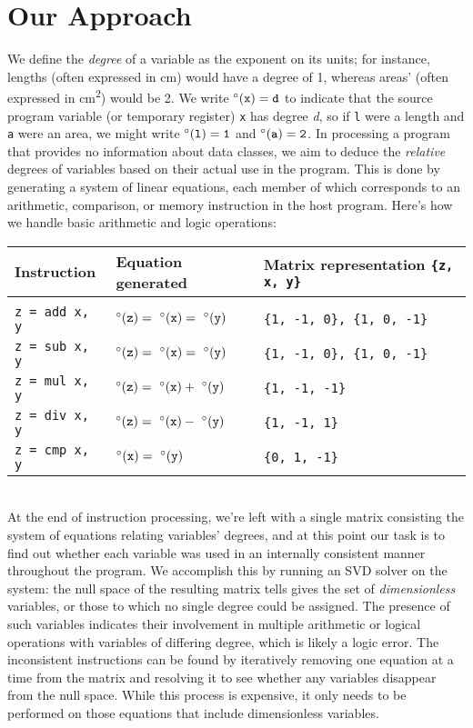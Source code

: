 \documentclass[12pt]{article}
\begin{document}
\section{Our Approach}

We define the \textit{degree} of a variable as the exponent on its units; for instance, lengths (often expressed in cm) would have a degree of 1, whereas areas' (often expressed in cm\textsuperscript{2}) would be 2.
We write $\degree(\tt{x}) = d$ to indicate that the source program variable (or temporary register) \texttt{x} has degree \textit{d}, so if \texttt{l} were a length and \texttt{a} were an area, we might write $\degree(\tt{l}) = 1$ and $\degree(\tt{a}) = 2$.
In processing a program that provides no information about data classes, we aim to deduce the \textit{relative} degrees of variables based on their actual use in the program.
This is done by generating a system of linear equations, each member of which corresponds to an arithmetic, comparison, or memory instruction in the host program.
Here's how we handle basic arithmetic and logic operations:
\\

\begin{tabular}{l l l}
\textbf{Instruction} & \textbf{Equation generated} & \textbf{Matrix representation \texttt{\{z, x, y\}}} \\
\hline \\
\texttt{z = add x, y} & $\degree(\tt{z}) =\ \degree(\tt{x}) =\ \degree(\tt{y})$ & \texttt{\{1, -1, 0\}, \{1, 0, -1\}}\\
\texttt{z = sub x, y} & $\degree(\tt{z}) =\ \degree(\tt{x}) =\ \degree(\tt{y})$ & \texttt{\{1, -1, 0\}, \{1, 0, -1\}}\\
\texttt{z = mul x, y} & $\degree(\tt{z}) =\ \degree(\tt{x}) +\ \degree(\tt{y})$ & \texttt{\{1, -1, -1\}} \\
\texttt{z = div x, y} & $\degree(\tt{z}) =\ \degree(\tt{x}) -\ \degree(\tt{y})$ & \texttt{\{1, -1, 1\}} \\
\texttt{z = cmp x, y} & $\degree(\tt{x}) =\ \degree(\tt{y})$ & \texttt{\{0, 1, -1\}} \\
\end{tabular}
\\

\noindent
At the end of instruction processing, we're left with a single matrix consisting the system of equations relating variables' degrees, and at this point our task is to find out whether each variable was used in an internally consistent manner throughout the program.
We accomplish this by running an SVD solver on the system: the null space of the resulting matrix tells gives the set of \textit{dimensionless} variables, or those to which no single degree could be assigned.
The presence of such variables indicates their involvement in multiple arithmetic or logical operations with variables of differing degree, which is likely a logic error.
The inconsistent instructions can be found by iteratively removing one equation at a time from the matrix and resolving it to see whether any variables disappear from the null space.
While this process is expensive, it only needs to be performed on those equations that include dimensionless variables.
\end{document}
